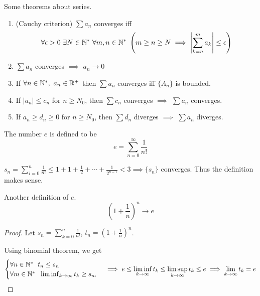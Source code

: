     \begin{theo} Some theorems about series.
        \begin{enumerate}
            \item (Cauchy criterion) $\sum a_n$ converges iff 
            \begin{equation}
                \forall \epsilon > 0 \ \exists N \in \N^* \ \forall m, n \in \N^* \ \left(m \geq n \geq N \implies \left| \sum_{k=n}^m a_k \right| \leq \epsilon \right)
            \end{equation}
            \item $\sum a_n$ converges $\implies$ $a_n \to 0$
            \item If $\forall n \in \mathbb{N}^*, \ a_n \in \mathbb{R}^+$ then $\sum a_n$ converges iff $\{A_n\}$ is bounded.

            \item If $| a_n | \leq c_n$ for $n \geq N_0$, then $\sum c_n$ converges $\implies$ $\sum a_n$ converges.

            \item If $a_n \geq d_n \geq 0$ for $n \geq N_0$, then $\sum d_n$ diverges $\implies$ $\sum a_n$ diverges.
        \end{enumerate}
    \end{theo}

    \begin{defi}
        The number $e$ is defined to be
        \begin{equation}
            e = \sum_{n=0}^{\infty} \frac{1}{n!}
        \end{equation}
    \end{defi}

    $s_n = \sum_{i=0}^n \frac{1}{n!} \leq 1 + 1 + \frac{1}{2} + \cdots + \frac{1}{2^{n-1}} < 3 \implies \{s_n\}$ converges. Thus the definition makes sense.

    \begin{theo}
        Another definition of $e$.
        \begin{equation}
            (1+\frac{1}{n})^n \to e
        \end{equation}
    \end{theo}
    \begin{framed}
        \begin{proof}
            Let $s_n = \sum_{k=0}^n \frac{1}{n!}$, $t_n = (1+\frac{1}{n})^n$.

            Using binomial theorem, we get
            \begin{equation}
                \begin{cases}
                    \forall n \in \mathbb{N}^* \ \ t_n \leq s_n \\
                    \forall m \in \mathbb{N}^* \ \ \liminf_{k \to \infty} t_k \geq s_m
                \end{cases}
                \implies e \leq \liminf_{k \to \infty} t_k \leq \limsup_{k \to \infty} t_k \leq e
                \implies \lim_{k \to \infty} t_k = e
            \end{equation}
        \end{proof}
    \end{framed}

